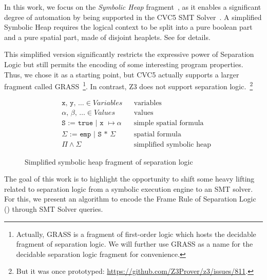 \documentclass[sigplan,screen,review]{acmart}
\begin{document}
In this work, we focus on the \emph{Symbolic Heap} fragment~\cite{DBLP:conf/fmco/BerdineCO05}, as it enables a significant degree of automation by being supported in the CVC5 SMT Solver~\cite{DBLP:conf/tacas/BarbosaBBKLMMMN22}. A simplified Symbolic Heap requires the logical context to be split into a pure boolean part and a pure spatial part, made of disjoint heaplets. See  for details.

This simplified version significantly restricts the expressive power of Separation Logic but still permits the encoding of some interesting program properties. Thus, we chose it as a starting point, but CVC5 actually supports a larger fragment called GRASS~\cite{DBLP:conf/cav/PiskacWZ13}\footnote{Actually, GRASS is a fragment of first-order logic which hosts the decidable fragment of separation logic. We will further use GRASS as a name for the decidable separation logic fragment for convenience.}. In contrast, Z3\cite{DBLP:conf/tacas/MouraB08} does not support separation logic.~\footnote{But it was once prototyped: \url{https://github.com/Z3Prover/z3/issues/811}.} 

\begin{figure}
\begin{prittybox}
\begin{align*}
    &\texttt{x, y, $\dots$} \in Variables &&\text{variables}\\
    &\texttt{$\alpha$, $\beta$, $\dots$} \in Values &&\text{values}\\
    &\texttt{S := true | x $\mapsto \alpha$} &&\text{simple spatial formula}\\
    &\texttt{$\Sigma$ := emp | S * $\Sigma$} &&\text{spatial formula}\\
    &\Pi \land \Sigma &&\text{simplified symbolic heap}
\end{align*}

\begin{prooftree}
\end{prooftree}
\caption{Simplified symbolic heap fragment of separation logic}
\end{prittybox}

\label{fig:framerule}
\end{figure}


The goal of this work is to highlight the opportunity to shift some heavy lifting related to separation logic from a symbolic execution engine to an SMT solver. For this, we present an algorithm to encode the Frame Rule of Separation Logic () through SMT Solver queries.
\end{document}
